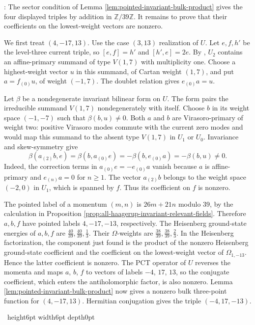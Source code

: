 \documentclass[leqno]{article}
\newcommand{\Z}{\ensuremath{\mathbb{Z}}}
\renewcommand{\geq}{\ensuremath{\geqslant}}
\newcommand{\qed}{\hfill \vrule height6pt  width6pt depth0pt}
\newenvironment{proof}[1][]{\noindent {\it Proof #1} : }{\hbox{~}\qed
\smallskip
}
\numberwithin{equation}{section}
\begin{document}
\begin{proof}
The sector condition of Lemma \ref{lem:pointed-invariant-bulk-product} gives the four displayed triples by addition in $\Z/39\Z$. It remains to prove that their coefficients on the lowest-weight vectors are nonzero.

We first treat $(4,-17,13)$. Use the case $(3,13)$ realization of $U$. Let $e,f,h'$ be the level-three current triple, so $[e,f] = h'$ and $[h',e] = 2e$. By \cite[Theorem 10.5 p.~30]{Arh26a}, $U_2$ contains an affine-primary summand of type $V(1,7)$ with multiplicity one. Choose a highest-weight vector $u$ in this summand, of Cartan weight $(1,7)$, and put $a = f_{(0)}u$, of weight $(-1,7)$. The doublet relation gives $e_{(0)}a = u$.

Let $\beta$ be a nondegenerate invariant bilinear form on $U$. The form pairs the irreducible summand $V(1,7)$ nondegenerately with itself. Choose $b$ in its weight space $(-1,-7)$ such that $\beta(b,u) \neq 0$. Both $a$ and $b$ are Virasoro-primary of weight two: positive Virasoro modes commute with the current zero modes and would map this summand to the absent type $V(1,7)$ in $U_1$ or $U_0$. Invariance and skew-symmetry give
\[
\beta(a_{(2)}b,e) = \beta(b,a_{(0)}e) = -\beta(b,e_{(0)}a) = -\beta(b,u) \neq 0.
\]
Indeed, the correction terms in $a_{(0)}e = -e_{(0)}a$ vanish because $a$ is affine-primary and $e_{(n)}a = 0$ for $n \geq 1$. The vector $a_{(2)}b$ belongs to the weight space $(-2,0)$ in $U_1$, which is spanned by $f$. Thus its coefficient on $f$ is nonzero.

The pointed label of a momentum $(m,n)$ is $26m+21n$ modulo $39$, by the calculation in Proposition \ref{prop:all-haagerup-invariant-relevant-fields}. Therefore $a,b,f$ have pointed labels $4,-17,-13$, respectively. The Heisenberg ground-state energies of $a,b,f$ are $\frac{40}{39},\frac{40}{39},\frac13$. Their $\Omega$-weights are $\frac{38}{39},\frac{38}{39},\frac23$. In the Heisenberg factorization, the component just found is the product of the nonzero Heisenberg ground-state coefficient and the coefficient on the lowest-weight vector of $\Omega_{1,-13}$. Hence the latter coefficient is nonzero. The PCT operator of $U$ reverses the momenta and maps $a$, $b$, $f$ to vectors of labels $-4$, $17$, $13$, so the conjugate coefficient, which enters the antiholomorphic factor, is also nonzero. Lemma \ref{lem:pointed-invariant-bulk-product} now gives a nonzero bulk three-point function for $(4,-17,13)$. Hermitian conjugation gives the triple $(-4,17,-13)$.


\end{proof}
\end{document}
